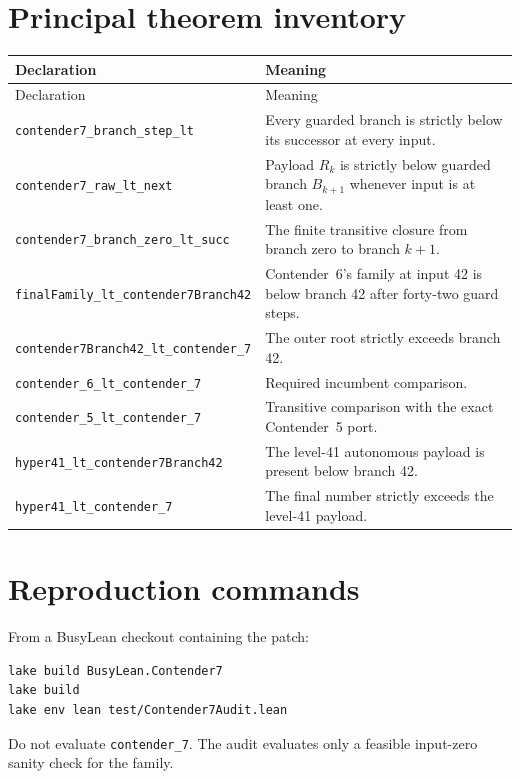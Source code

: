 \documentclass[11pt]{article}
\theoremstyle{definition}
\theoremstyle{remark}
\newcommand{\lean}[1]{\texttt{#1}}
\begin{document}
\appendix
\section{Principal theorem inventory}

\begin{longtable}{p{}p{}}
\toprule
Declaration & Meaning\\
\midrule
\endfirsthead
\toprule
Declaration & Meaning\\
\midrule
\endhead
\lean{contender7\_branch\_step\_lt} & Every guarded branch is strictly below its successor at every input.\\
\lean{contender7\_raw\_lt\_next} & Payload $R_k$ is strictly below guarded branch $B_{k+1}$ whenever input is at least one.\\
\lean{contender7\_branch\_zero\_lt\_succ} & The finite transitive closure from branch zero to branch $k+1$.\\
\lean{finalFamily\_lt\_contender7Branch42} & Contender~6's family at input 42 is below branch 42 after forty-two guard steps.\\
\lean{contender7Branch42\_lt\_contender\_7} & The outer root strictly exceeds branch 42.\\
\lean{contender\_6\_lt\_contender\_7} & Required incumbent comparison.\\
\lean{contender\_5\_lt\_contender\_7} & Transitive comparison with the exact Contender~5 port.\\
\lean{hyper41\_lt\_contender7Branch42} & The level-41 autonomous payload is present below branch 42.\\
\lean{hyper41\_lt\_contender\_7} & The final number strictly exceeds the level-41 payload.\\
\bottomrule
\end{longtable}

\section{Reproduction commands}

From a BusyLean checkout containing the patch:
\begin{verbatim}
lake build BusyLean.Contender7
lake build
lake env lean test/Contender7Audit.lean
\end{verbatim}
Do not evaluate \lean{contender\_7}.  The audit evaluates only a feasible
input-zero sanity check for the family.
\end{document}
